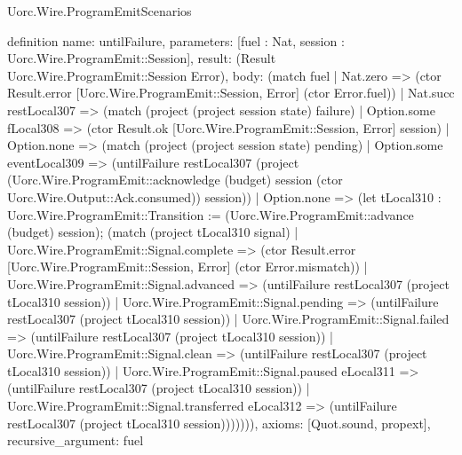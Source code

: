 \begin{lexlean}{Uorc.Wire.ProgramEmitScenarios}
\begin{semanticmodule}
definition{
  name: untilFailure,
  parameters: [fuel : Nat, session : Uorc.Wire.ProgramEmit::Session],
  result: (Result Uorc.Wire.ProgramEmit::Session Error),
  body: (match fuel
    | Nat.zero => (ctor Result.error [Uorc.Wire.ProgramEmit::Session, Error] (ctor Error.fuel))
    | Nat.succ restLocal307 => (match (project (project session state) failure)
      | Option.some fLocal308 => (ctor Result.ok [Uorc.Wire.ProgramEmit::Session, Error] session)
      | Option.none => (match (project (project session state) pending)
        | Option.some eventLocal309 => (untilFailure restLocal307 (project (Uorc.Wire.ProgramEmit::acknowledge (budget) session (ctor Uorc.Wire.Output::Ack.consumed)) session))
        | Option.none => (let tLocal310 : Uorc.Wire.ProgramEmit::Transition := (Uorc.Wire.ProgramEmit::advance (budget) session); (match (project tLocal310 signal)
          | Uorc.Wire.ProgramEmit::Signal.complete => (ctor Result.error [Uorc.Wire.ProgramEmit::Session, Error] (ctor Error.mismatch))
          | Uorc.Wire.ProgramEmit::Signal.advanced => (untilFailure restLocal307 (project tLocal310 session))
          | Uorc.Wire.ProgramEmit::Signal.pending => (untilFailure restLocal307 (project tLocal310 session))
          | Uorc.Wire.ProgramEmit::Signal.failed => (untilFailure restLocal307 (project tLocal310 session))
          | Uorc.Wire.ProgramEmit::Signal.clean => (untilFailure restLocal307 (project tLocal310 session))
          | Uorc.Wire.ProgramEmit::Signal.paused eLocal311 => (untilFailure restLocal307 (project tLocal310 session))
          | Uorc.Wire.ProgramEmit::Signal.transferred eLocal312 => (untilFailure restLocal307 (project tLocal310 session))))))),
  axioms: [Quot.sound, propext],
  recursive_argument: fuel
}


\end{semanticmodule}
\end{lexlean}
